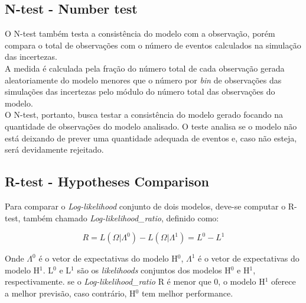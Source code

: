 \subsection{N-test - Number test}
O N-test também testa a consistência do modelo com a observação, porém compara o total de observações com o número de eventos calculados na simulação das incertezas.\\ %

A medida é calculada pela fração do número total de cada observação gerada aleatoriamente do modelo menores que o número por {\it bin} de observações das simulações das incertezas pelo módulo do número total das observações do modelo.\\


O N-test, portanto, busca testar a consistência do modelo gerado focando na quantidade de observações do modelo analisado. O teste analisa se o modelo não está deixando de prever uma quantidade adequada de eventos e, caso não esteja, será devidamente rejeitado.
\subsection{R-test - Hypotheses Comparison}
Para comparar o {\it Log-likelihood} conjunto de dois modelos, deve-se computar o R-test, também chamado {\it Log-likelihood\_ratio}, definido como:

\begin{equation}
	R = L(\Omega|\Lambda^0) - L(\Omega|\Lambda^1) = L^0 - L^1
\end{equation}


Onde $\Lambda^0$ é o vetor de expectativas do modelo H$^0$, $\Lambda^1$ é o vetor de expectativas do modelo H$^1$. L$^0$ e L$^1$ são os {\it likelihoods} conjuntos dos modelos H$^0$ e H$^1$, respectivamente. se o {\it Log-likelihood\_ratio} R é menor que 0, o modelo H$^1$ oferece a melhor previsão, caso contrário, H$^0$ tem melhor performance.\\

